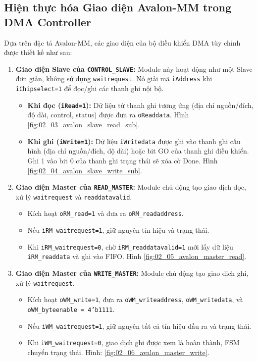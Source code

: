 \subsection{Hiện thực hóa Giao diện Avalon-MM trong DMA Controller}
Dựa trên đặc tả Avalon-MM, các giao diện của bộ điều khiển DMA tùy chỉnh được thiết kế như sau:
\begin{enumerate}
    \item \textbf{Giao diện Slave của \texttt{CONTROL\_SLAVE}:} Module này hoạt động như một Slave đơn giản, không sử dụng \texttt{waitrequest}. Nó giải mã \texttt{iAddress} khi \texttt{iChipselect=1} để đọc/ghi các thanh ghi nội bộ.
        \begin{itemize}
            \item \textbf{Khi đọc (\texttt{iRead=1}):} Dữ liệu từ thanh ghi tương ứng (địa chỉ nguồn/đích, độ dài, control, status) được đưa ra \texttt{oReaddata}. Hình \ref{fig:02_03_avalon_slave_read_sub}.
            \item \textbf{Khi ghi (\texttt{iWrite=1}):} Dữ liệu \texttt{iWritedata} được ghi vào thanh ghi cấu hình (địa chỉ nguồn/đích, độ dài) hoặc bit GO của thanh ghi điều khiển. Ghi 1 vào bit 0 của thanh ghi trạng thái sẽ xóa cờ Done. Hình \ref{fig:02_04_avalon_slave_write_sub}.
        \end{itemize}

     \item \textbf{Giao diện Master của \texttt{READ\_MASTER}:} Module chủ động tạo giao dịch đọc, xử lý \texttt{waitrequest} và \texttt{readdatavalid}.
        \begin{itemize}
            \item Kích hoạt \texttt{oRM\_read=1} và đưa ra \texttt{oRM\_readaddress}.
            \item Nếu \texttt{iRM\_waitrequest=1}, giữ nguyên tín hiệu và trạng thái.
            \item Khi \texttt{iRM\_waitrequest=0}, chờ \texttt{iRM\_readdatavalid=1} mới lấy dữ liệu \texttt{iRM\_readdata} và ghi vào FIFO. Hình \ref{fig:02_05_avalon_master_read}.
        \end{itemize}

    \item \textbf{Giao diện Master của \texttt{WRITE\_MASTER}:} Module chủ động tạo giao dịch ghi, xử lý \texttt{waitrequest}.
        \begin{itemize}
            \item Kích hoạt \texttt{oWM\_write=1}, đưa ra \texttt{oWM\_writeaddress}, \texttt{oWM\_writedata}, và \texttt{oWM\_byteenable = 4'b1111}.
            \item Nếu \texttt{iWM\_waitrequest=1}, giữ nguyên tất cả tín hiệu đầu ra và trạng thái.
            \item Khi \texttt{iWM\_waitrequest=0}, giao dịch ghi được xem là hoàn thành, FSM chuyển trạng thái. Hình: \ref{fig:02_06_avalon_master_write}.
        \end{itemize}
\end{enumerate}


